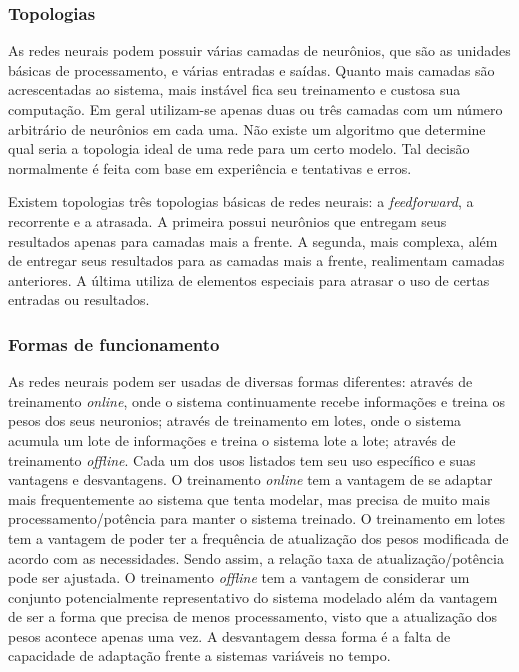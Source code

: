 \subsubsection{Topologias}
As redes neurais podem possuir v\'arias camadas de neur\^onios, que s\~ao as unidades b\'asicas de processamento, e v\'arias entradas e saídas.
Quanto mais camadas s\~ao acrescentadas ao sistema, mais inst\'avel fica seu treinamento e custosa sua computa\c{c}\~ao.
Em geral utilizam-se apenas duas ou três camadas com um n\'umero arbitr\'ario de neur\^onios em cada uma.
N\~ao existe um algoritmo que determine qual seria a topologia ideal de uma rede para um certo modelo.
Tal decis\~ao normalmente \'e feita com base em experiência e tentativas e erros.

Existem topologias três topologias b\'asicas de redes neurais: a \textit{feedforward}, a recorrente e a atrasada.
A primeira possui neur\^onios que entregam seus resultados apenas para camadas mais a frente.
A segunda, mais complexa, al\'em de entregar seus resultados para as camadas mais a frente, realimentam camadas anteriores.
A \'ultima utiliza de elementos especiais para atrasar o uso de certas entradas ou resultados.

\subsubsection{Formas de funcionamento}
As redes neurais podem ser usadas de diversas formas diferentes: atrav\'es de treinamento \textit{online}, onde o sistema continuamente recebe informa\c{c}\~oes e treina os pesos dos seus neuronios; atrav\'es de treinamento em lotes, onde o sistema acumula um lote de informa\c{c}\~oes e treina o sistema lote a lote; atrav\'es de treinamento \textit{offline}.
Cada um dos usos listados tem seu uso específico e suas vantagens e desvantagens.
O treinamento \textit{online} tem a vantagem de se adaptar mais frequentemente ao sistema que tenta modelar, mas precisa de muito mais processamento/potência para manter o sistema treinado.
O treinamento em lotes tem a vantagem de poder ter a frequência de atualiza\c{c}\~ao dos pesos modificada de acordo com as necessidades.
Sendo assim, a rela\c{c}\~ao taxa de atualiza\c{c}\~ao/potência pode ser ajustada.
O treinamento \textit{offline} tem a vantagem de considerar um conjunto potencialmente representativo do sistema modelado al\'em da vantagem de ser a forma que precisa de menos processamento, visto que a atualiza\c{c}\~ao dos pesos acontece apenas uma vez.
A desvantagem dessa forma \'e a falta de capacidade de adapta\c{c}\~ao frente a sistemas vari\'aveis no tempo.

